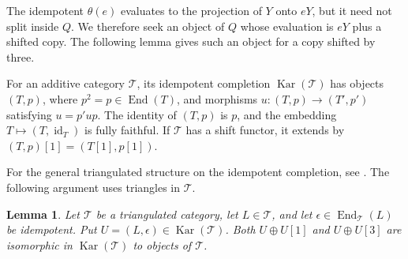 \documentclass[11pt]{article}
\numberwithin{equation}{section}
\newtheorem{lemma}[theorem]{Lemma}
\theoremstyle{definition}
\theoremstyle{remark}
\DeclareMathOperator{\End}{End}
\DeclareMathOperator{\id}{id}
\DeclareMathOperator{\Kar}{Kar}
\begin{document}
The idempotent $\theta(e)$ evaluates to the projection of $Y$ onto
$eY$, but it need not split inside $Q$. We therefore seek an object
of $Q$ whose evaluation is $eY$ plus a shifted copy. The following
lemma gives such an object for a copy shifted by three.

For an additive category $\mathcal T$, its idempotent completion
$\Kar(\mathcal T)$ has objects $(T,p)$, where $p^2=p\in\End(T)$,
and morphisms $u:(T,p)\to(T',p')$ satisfying $u=p'up$.
The identity of $(T,p)$ is $p$, and the embedding
$T\mapsto(T,\id_T)$ is fully faithful.
If $\mathcal T$ has a shift functor, it extends
by $(T,p)[1]=(T[1],p[1])$.

For the general triangulated structure on the idempotent completion,
see \cite[Theorem~1.5]{BalmerSchlichting2001}. The following argument
uses triangles in $\mathcal T$.

\begin{lemma}\label{lem:odd-double}
Let $\mathcal T$ be a triangulated category, let $L\in\mathcal T$,
and let $\epsilon\in\End_{\mathcal T}(L)$ be idempotent.
Put $U=(L,\epsilon)\in\Kar(\mathcal T)$.
Both $U\oplus U[1]$ and $U\oplus U[3]$ are isomorphic in
$\Kar(\mathcal T)$ to objects of $\mathcal T$.
\end{lemma}
\end{document}
